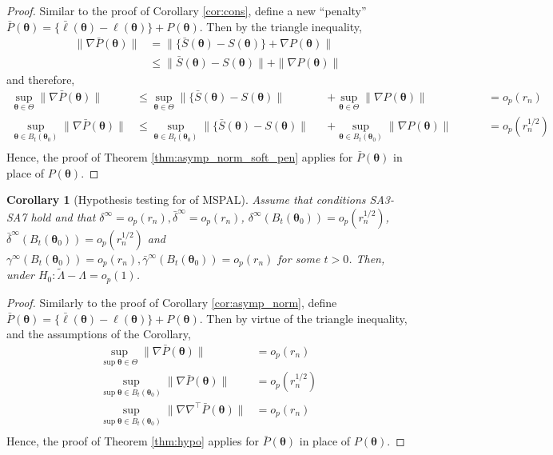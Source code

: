 \documentclass[11pt, a4paper]{article}
\newcommand*{\bb}{\boldsymbol}
\theoremstyle{example} \newtheorem{example}{Example}[section]
\theoremstyle{theorem} \newtheorem{theorem}{Theorem}[section]
\theoremstyle{theorem }\newtheorem{proposition}{Proposition}[section]
\theoremstyle{theorem }\newtheorem{corollary}{Corollary}[section]
\def\\bbeta{\bb{\\bbeta}}
\def\btheta{\bb{\theta}}
\def\btnod{\bb{\theta}_0}
\begin{document}
	\begin{proof}
		Similar to the proof of Corollary \ref{cor:cons}, define a new ``penalty'' $\bar{P}(\btheta) = \{\bar{\ell}(\btheta)-\ell(\btheta)\}  + P(\btheta)$. Then by the triangle inequality, 
		\begin{equation}
			\begin{aligned}
				\| \nabla \bar{P}(\btheta) \| &= \|\{\bar{S}(\btheta)-{S}(\btheta) \} + \nabla P(\btheta) \| \\ 
				& \leq \|\bar{S}(\btheta) - {S}(\btheta) \| + \| \nabla P(\btheta) \| 
			\end{aligned}
		\end{equation}
		and therefore, 
		\begin{equation}
			\begin{aligned}
				\underset{\btheta \in \Theta}{\sup} 	\| \nabla \bar{P}(\btheta) \| & \leq \underset{\btheta \in \Theta}{\sup} \|\{\bar{S}(\btheta)-{S}(\btheta)\| &&+  \underset{\btheta \in \Theta}{\sup}\| \nabla P(\btheta) \|  &&&& = o_p(r_n) \\ 
				\underset{\btheta \in B_t(\btnod)}{\sup}	\| \nabla \bar{P}(\btheta) \| &\leq \underset{\btheta \in B_t(\btnod)}{\sup} \|\{\bar{S}(\btheta)-{S}(\btheta) \| &&+ \underset{\btheta \in B_t(\btnod)}{\sup}\| \nabla P(\btheta) \|  &&&& = o_p(r_n^{1/2}) \\ 
			\end{aligned}
		\end{equation}
		Hence, the proof of Theorem \ref{thm:asymp_norm_soft_pen} applies for $\bar{P}(\btheta)$ in place of $P(\btheta)$.
	\end{proof}
	\begin{corollary}[Hypothesis testing for of MSPAL]
		Assume that conditions SA3-SA7 hold and that $\delta^\infty = o_p(r_n), \bar{\delta}^\infty = o_p(r_n)$, $\delta^\infty(B_t(\btnod)) = o_p(r_n^{1/2})$,\linebreak $\bar{\delta}^\infty(B_t(\btnod)) = o_p(r_n^{1/2})$ and $\gamma^\infty(B_t(\btnod)) = o_p(r_n), \bar{\gamma}^\infty(B_t(\btnod)) = o_p(r_n)$ for some $t>0$. Then, under $H_0: \tilde{\Lambda} - \Lambda = o_p(1)$.
	\end{corollary}
	\begin{proof}
		Similarly to the proof of Corollary \ref{cor:asymp_norm}, define $\bar{P}(\btheta) = \{\bar{\ell}(\btheta)-\ell(\btheta)\} + P(\btheta)$. Then by virtue of the triangle inequality, and the assumptions of the Corollary, 
		\begin{equation}
			\begin{aligned}
				\underset{\sup \btheta \in \Theta}{\sup} \| \nabla \bar{P}(\btheta) \| &= o_p(r_n) \\ 
				\underset{\sup \btheta \in B_t(\btnod)}{\sup} \| \nabla \bar{P}(\btheta) \| &= o_p(r_n^{1/2}) \\
				\underset{\sup \btheta \in B_t(\btnod)}{\sup} \| \nabla \nabla^\top \bar{P}(\btheta) \| &= o_p(r_n) \\
			\end{aligned}
		\end{equation}
		Hence, the proof of Theorem \ref{thm:hypo} applies for $\bar{P}(\btheta)$ in place of $P(\btheta)$.
	\end{proof}
\end{document}
